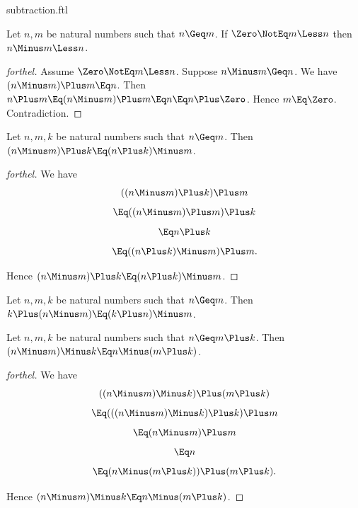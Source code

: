 \documentclass{stex}
\begin{document}
\begin{smodule}{subtraction.ftl}
\begin{proposition*}[forthel]
  Let $n, m$ be natural numbers such that $n \Geq m$.
  If $\Zero \NotEq m \Less n$ then $n \Minus m \Less n$.
\end{proposition*}
\begin{proof}[forthel]
  Assume $\Zero \NotEq m \Less n$.
  Suppose $n \Minus m \Geq n$.
  We have $(n \Minus m) \Plus m \Eq n$.
  Then $n \Plus m
    \Eq (n \Minus m) \Plus m
    \Eq n
    \Eq n \Plus \Zero$.
  Hence $m \Eq \Zero$.
  Contradiction.
\end{proof}

\begin{proposition*}[forthel]
  Let $n, m, k$ be natural numbers such that $n \Geq m$.
  Then $(n \Minus m) \Plus k \Eq (n \Plus k) \Minus m$.
\end{proposition*}
\begin{proof}[forthel]
  We have
  \[  ((n \Minus m) \Plus k) \Plus m       \]
  \[    \Eq ((n \Minus m) \Plus m) \Plus k   \]
  \[    \Eq n \Plus k               \]
  \[    \Eq ((n \Plus k) \Minus m) \Plus m.  \]

  Hence $(n \Minus m) \Plus k \Eq (n \Plus k) \Minus m$.
\end{proof}

\begin{proposition*}[forthel,name=associativity of addition and subtraction]
  Let $n, m, k$ be natural numbers such that $n \Geq m$.
  Then $k \Plus (n \Minus m) \Eq (k \Plus n) \Minus m$.
\end{proposition*}

\begin{proposition*}[forthel]
  Let $n, m, k$ be natural numbers such that $n \Geq  m \Plus k$.
  Then $(n \Minus m) \Minus k \Eq n \Minus (m \Plus k)$.
\end{proposition*}
\begin{proof}[forthel]
  We have
  \[  ((n \Minus m) \Minus k) \Plus (m \Plus k)       \]
  \[    \Eq (((n \Minus m) \Minus k) \Plus k) \Plus m   \]
  \[    \Eq (n \Minus m) \Plus m               \]
  \[    \Eq n                         \]
  \[    \Eq (n \Minus (m \Plus k)) \Plus (m \Plus k).  \]

  Hence $(n \Minus m) \Minus k \Eq n \Minus (m \Plus k)$.
\end{proof}

\end{smodule}
\end{document}
